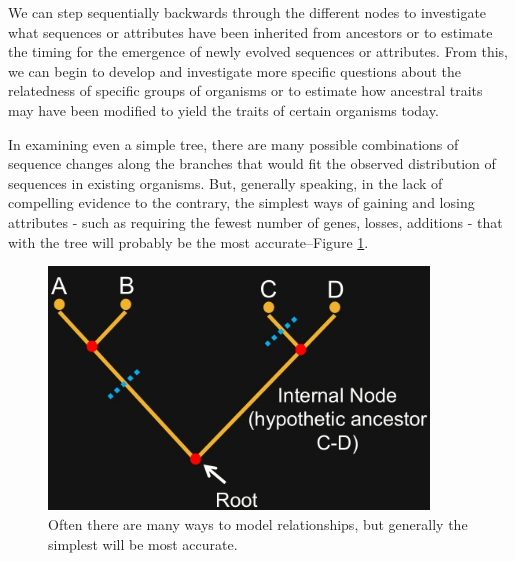\documentclass[]{article}
\begin{document}
We can step sequentially backwards
through the different nodes
to investigate
what sequences or attributes
have been inherited from ancestors
or to estimate the timing
for the emergence
of newly evolved sequences or attributes.
From this, we can begin to develop
and investigate more specific questions
about the relatedness
of specific groups of organisms
or to estimate how ancestral traits
may have been modified
to yield the traits
of certain organisms today.

In examining even a simple tree,
there are many possible combinations
of sequence changes along the branches
that would fit the observed distribution
of sequences in existing organisms.
But, generally speaking,
in the lack of compelling evidence
to the contrary,
the simplest ways of gaining
and losing attributes -
such as requiring the fewest number
of genes, losses, additions -
that with the tree
will probably be the most accurate--Figure \ref{fig:PhylogenicTree}.

\begin{figure}[H]
	\caption[Generally the simplest tree will be most accurate]{Often there are many ways to model relationships, but generally the simplest will be most accurate.}\label{fig:PhylogenicTree}
	\includegraphics[width=0.9\textwidth]{PhylogenicTree}
\end{figure}
\end{document}

